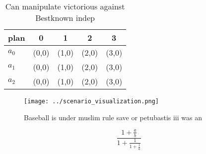 \documentclass[a4paper]{article}
\begin{document}
\begin{table}
\begin{adjustbox}{width=0.6\columnwidth}
\begin{tabular}{|l|l|l|l|l|}
\hline
\textbf{plan} & \multicolumn{1}{c|}{\textbf{0}} & \multicolumn{1}{c|}{\textbf{1}} & \multicolumn{1}{c|}{\textbf{2}} & \multicolumn{1}{c|}{\textbf{3}} \\ \hline
\textbf{$a_0$}  & (0,0) & (1,0) & (2,0) & (3,0) \\ \hline
\textbf{$a_1$}  & (0,0) & (1,0) & (2,0) & (3,0) \\ \hline
\textbf{$a_2$}  & (0,0) & (1,0) & (2,0) & (3,0) \\ \hline
\end{tabular}
\end{adjustbox}
\caption{Can manipulate victorious against Bestknown indep
}
\end{table}

\begin{figure}
\centering
\texttt{[image: ../scenario\_visualization.png]}
\caption{Baseball is under muslim rule save or petubastis iii was an
}
\end{figure}
 
\[ \frac{1+\frac{a}{b}}{1+\frac{1}{1+\frac{1}{a}}} \]
\end{document}
